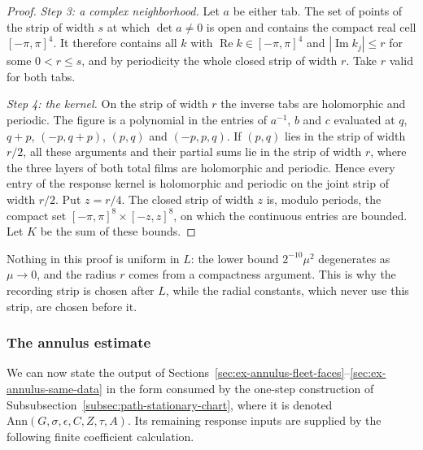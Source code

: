 \begin{proof}
\emph{Step 3: a complex neighborhood.} Let $a$ be either tab. The set
of points of the strip of width $s$ at which $\det a\ne0$ is open and
contains the compact real cell $[-\pi,\pi]^4$. It therefore contains
all $k$ with $\operatorname{Re}k\in[-\pi,\pi]^4$ and
$|\operatorname{Im}k_j|\leq r$ for some $0<r\leq s$, and by periodicity
the whole closed strip of width $r$. Take $r$ valid for both tabs.

\emph{Step 4: the kernel.} On the strip of width $r$ the inverse tabs
are holomorphic and periodic. The figure is a polynomial in the
entries of $a^{-1}$, $b$ and $c$ evaluated at $q$, $q+p$, $(-p,q+p)$,
$(p,q)$ and $(-p,p,q)$. If $(p,q)$ lies in the strip of width $r/2$,
all these arguments and their partial sums lie in the strip of width
$r$, where the three layers of both total films are holomorphic and
periodic. Hence every entry of the response kernel is holomorphic and
periodic on the joint strip of width $r/2$. Put $z=r/4$. The closed
strip of width $z$ is, modulo periods, the compact set
$[-\pi,\pi]^8\times[-z,z]^8$, on which the continuous entries are
bounded. Let $K$ be the sum of these bounds.
\end{proof}

Nothing in this proof is uniform in $L$: the lower bound $2^{-10}\mu^2$
degenerates as $\mu\to0$, and the radius $r$ comes from a compactness
argument. This is why the recording strip is chosen after $L$, while the
radial constants, which never use this strip, are chosen before it.

\subsubsection{The annulus estimate}

We can now state the output of
Sections~\ref{sec:ex-annulus-fleet-faces}--\ref{sec:ex-annulus-same-data}
in the form consumed by the one-step construction of
Subsubsection~\ref{subsec:path-stationary-chart}, where it is denoted
$\mathrm{Ann}(G,\sigma,\epsilon,C,Z,\tau,A)$. Its remaining response inputs are supplied by the following finite
coefficient calculation.

